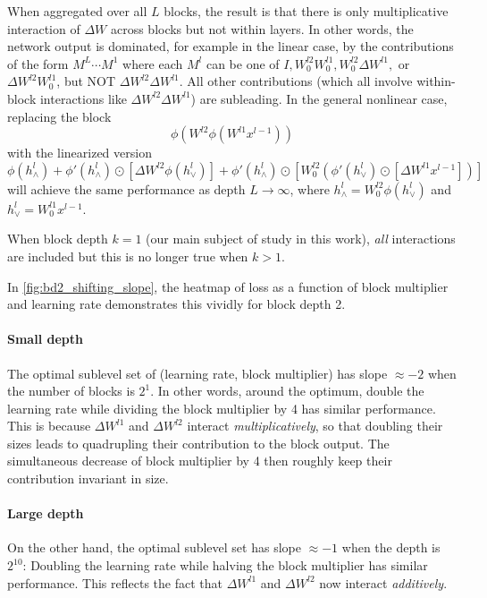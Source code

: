 \documentclass{article}
\theoremstyle{plain}
\theoremstyle{definition}
\begin{document}
When aggregated over all $L$ blocks, the result is that there is only multiplicative interaction of $\Delta W$ across blocks but not within layers.
In other words, the network output is dominated, for example in the linear case, by the contributions of the form
$M^L \cdots M^1$
where each $M^l$ can be one of $I, W_0^{l2} W_0^{l1}, W_0^{l2} \Delta W^{l1},$ or $\Delta W^{l2} W_0^{l1}$, but NOT $\Delta W^{l2} \Delta W^{l1}$.
All other contributions (which all involve within-block interactions like $\Delta W^{l2} \Delta W^{l1}$) are subleading. 
In the general nonlinear case, replacing the block 
\begin{equation*}
    \phi(W^{l2}\phi(W^{l1} x^{l-1}))    
\end{equation*}
with the linearized version 
\begin{equation*}
    \phi(h^l_\wedge) + \phi'(h^l_\wedge) \odot [\Delta W^{l2}\phi(h^l_\vee)] + \phi'(h^l_\wedge) \odot [W_0^{l2} (\phi'(h^l_\vee) \odot [\Delta W^{l1} x^{l-1}])]    
\end{equation*}
will achieve the same performance as depth $L \to \infty$,
where $h^l_\wedge = W_0^{l2}\phi(h^l_\vee)$ and $h^l_\vee = W_0^{l1} x^{l-1}$.

When block depth $k=1$ (our main subject of study in this work), \emph{all} interactions are included but this is no longer true when $k>1$.

In \cref{fig:bd2_shifting_slope}, the heatmap of loss as a function of block multiplier and learning rate demonstrates this vividly for block depth 2.

\paragraph{Small depth}
The optimal sublevel set of (learning rate, block multiplier) has slope $\approx -2$ when the number of blocks is $2^1$. In other words, around the optimum, double the learning rate while dividing the block multiplier by 4 has similar performance. This is because $\Delta W^{l1}$ and $\Delta W^{l2}$ interact \emph{multiplicatively}, so that doubling their sizes leads to quadrupling their contribution to the block output. The simultaneous decrease of block multiplier by 4 then roughly keep their contribution invariant in size.

\paragraph{Large depth}
On the other hand, the optimal sublevel set has slope $\approx -1$ when the depth is $2^{10}$: Doubling the learning rate while halving the block multiplier has similar performance. This reflects the fact that  $\Delta W^{l1}$ and $\Delta W^{l2}$ now interact \emph{additively}. 
\end{document}

